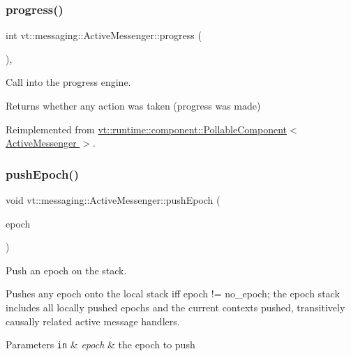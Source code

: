 \subsubsection{\texorpdfstring{progress()}{progress()}}
{\footnotesize\ttfamily int vt\+::messaging\+::\+Active\+Messenger\+::progress (\begin{DoxyParamCaption}{ }\end{DoxyParamCaption})\hspace{0.3cm}{\ttfamily [override]}, {\ttfamily [virtual]}}



Call into the progress engine. 

\begin{DoxyReturn}{Returns}
whether any action was taken (progress was made) 
\end{DoxyReturn}


Reimplemented from \hyperlink{structvt_1_1runtime_1_1component_1_1_pollable_component_a34cad810026224d550cd9b0c9d1eff22}{vt\+::runtime\+::component\+::\+Pollable\+Component$<$ Active\+Messenger $>$}.

\mbox{\label{structvt_1_1messaging_1_1_active_messenger_ac60a61b85392a5c40d2334919981963a}} 
\subsubsection{\texorpdfstring{push\+Epoch()}{pushEpoch()}}
{\footnotesize\ttfamily void vt\+::messaging\+::\+Active\+Messenger\+::push\+Epoch (\begin{DoxyParamCaption}\item[{\hyperlink{namespacevt_a985a5adf291c34a3ca263b3378388236}{Epoch\+Type} const \&}]{epoch }\end{DoxyParamCaption})\hspace{0.3cm}{\ttfamily [inline]}}



Push an epoch on the stack. 

Pushes any epoch onto the local stack iff epoch != no\+\_\+epoch; the epoch stack includes all locally pushed epochs and the current contexts pushed, transitively causally related active message handlers.


\begin{DoxyParams}[1]{Parameters}
\mbox{\tt in}  & {\em epoch} & the epoch to push \\
\hline
\end{DoxyParams}
\mbox{\label{structvt_1_1messaging_1_1_active_messenger_a33b2e3e047d0b1f6eb1398691f075b31}} 
